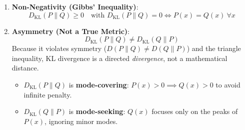 \begin{keyidea}
\begin{enumerate}
    \item \textbf{Non-Negativity (Gibbs' Inequality)}:
    \begin{equation}
    D_{\text{KL}}(P \parallel Q) \ge 0 \quad \text{with } D_{\text{KL}}(P \parallel Q) = 0 \iff P(x) = Q(x) \ \forall x
    \end{equation}
    \item \textbf{Asymmetry (Not a True Metric)}:
    \begin{equation}
    D_{\text{KL}}(P \parallel Q) \ne D_{\text{KL}}(Q \parallel P)
    \end{equation}
    Because it violates symmetry ($D(P \parallel Q) \ne D(Q \parallel P)$) and the triangle inequality, KL divergence is a directed \textit{divergence}, not a mathematical distance.
    \begin{itemize}
        \item $D_{\text{KL}}(P \parallel Q)$ is \textbf{mode-covering}: $P(x) > 0 \implies Q(x) > 0$ to avoid infinite penalty.
        \item $D_{\text{KL}}(Q \parallel P)$ is \textbf{mode-seeking}: $Q(x)$ focuses only on the peaks of $P(x)$, ignoring minor modes.
    \end{itemize}
\end{enumerate}
\end{keyidea}

